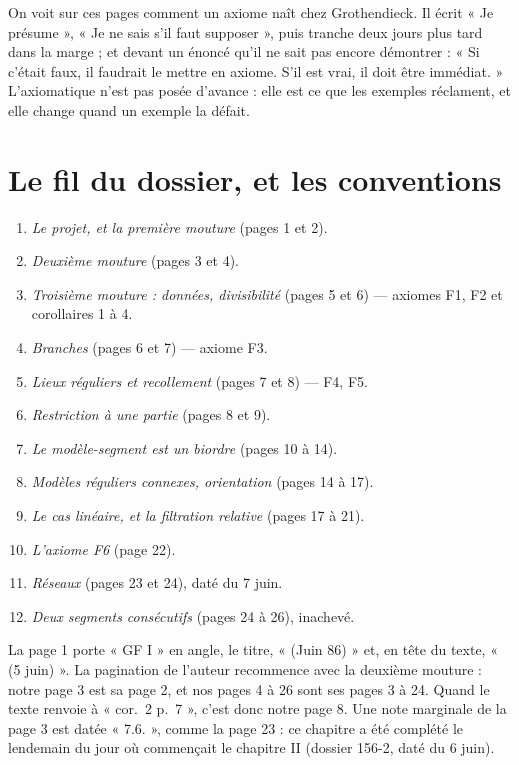 \documentclass[11pt,a4paper]{article}
\begin{document}
\begin{resume}
On voit sur ces pages comment un axiome naît chez Grothendieck. Il écrit « Je
présume », « Je ne sais s'il faut supposer », puis tranche deux jours plus
tard dans la marge ; et devant un énoncé qu'il ne sait pas encore démontrer :
« Si c'était faux, il faudrait le mettre en axiome. S'il est vrai, il doit
être immédiat. » L'axiomatique n'est pas posée d'avance : elle est ce que les
exemples réclament, et elle change quand un exemple la défait.

\end{resume}

\section*{Le fil du dossier, et les conventions}

\begin{enumerate}
\item[1.] \emph{Le projet, et la première mouture} (pages 1 et 2).
\item[2.] \emph{Deuxième mouture} (pages 3 et 4).
\item[3.] \emph{Troisième mouture : données, divisibilité} (pages 5 et 6) ---
axiomes F1, F2 et corollaires 1 à 4.
\item[4.] \emph{Branches} (pages 6 et 7) --- axiome F3.
\item[5.] \emph{Lieux réguliers et recollement} (pages 7 et 8) --- F4, F5.
\item[6.] \emph{Restriction à une partie} (pages 8 et 9).
\item[7.] \emph{Le modèle-segment est un biordre} (pages 10 à 14).
\item[8.] \emph{Modèles réguliers connexes, orientation} (pages 14 à 17).
\item[9.] \emph{Le cas linéaire, et la filtration relative} (pages 17 à 21).
\item[10.] \emph{L'axiome F6} (page 22).
\item[11.] \emph{Réseaux} (pages 23 et 24), daté du 7 juin.
\item[12.] \emph{Deux segments consécutifs} (pages 24 à 26), inachevé.
\end{enumerate}

La page 1 porte « GF I » en angle, le titre, « (Juin 86) » et, en tête du
texte, « (5 juin) ». La pagination de l'auteur recommence avec la deuxième
mouture : notre page 3 est sa page 2, et nos pages 4 à 26 sont ses pages 3 à
24. Quand le texte renvoie à « cor.~2 p.~7 », c'est donc notre page 8. Une note
marginale de la page 3 est datée « 7.6. », comme la page 23 : ce chapitre a
été complété le lendemain du jour où commençait le chapitre II (dossier
156-2, daté du 6 juin).
\end{document}
